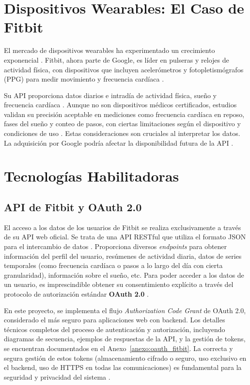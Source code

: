\section{Dispositivos Wearables: El Caso de Fitbit}
\label{sec:ea_fitbit}

El mercado de dispositivos wearables ha experimentado un crecimiento exponencial \cite{fortune_wearable_market}. Fitbit\textsuperscript{\textregistered}, ahora parte de Google, es líder en pulseras y relojes de actividad física, con dispositivos que incluyen acelerómetros y fotopletismógrafos (PPG) para medir movimiento y frecuencia cardíaca \cite{fitbit_how_hr_works}.

Su API proporciona datos diarios e intradía de actividad física, sueño y frecuencia cardíaca \cite{fitbit_api_reference}. Aunque no son dispositivos médicos certificados, estudios validan su precisión aceptable en mediciones como frecuencia cardíaca en reposo, fases del sueño y conteo de pasos, con ciertas limitaciones según el dispositivo y condiciones de uso \cite{haghayegh2019accuracy, nelson2016validity}. Estas consideraciones son cruciales al interpretar los datos. La adquisición por Google podría afectar la disponibilidad futura de la API \cite{google_fitbit_acquisition_info}.
\section{Tecnologías Habilitadoras}
\label{sec:ea_tecnologias}

\subsection{API de Fitbit y OAuth 2.0}
\label{subsec:ea_fitbit_api_oauth}
El acceso a los datos de los usuarios de Fitbit\textsuperscript{\textregistered} se realiza exclusivamente a través de su API web oficial. Se trata de una API RESTful que utiliza el formato JSON para el intercambio de datos \cite{fitbit_api_reference}. Proporciona diversos \textit{endpoints} para obtener información del perfil del usuario, resúmenes de actividad diaria, datos de series temporales (como frecuencia cardíaca o pasos a lo largo del día con cierta granularidad), información sobre el sueño, etc. Para poder acceder a los datos de un usuario, es imprescindible obtener su consentimiento explícito a través del protocolo de autorización estándar \textbf{OAuth 2.0} \cite{oauth_spec_rfc6749}.

En este proyecto, se implementa el flujo \textit{Authorization Code Grant} de OAuth 2.0, considerado el más seguro para aplicaciones web con backend. Los detalles técnicos completos del proceso de autenticación y autorización, incluyendo diagramas de secuencia, ejemplos de respuestas de la API, y la gestión de tokens, se encuentran documentados en el Anexo~\ref{anexo:oauth_fitbit}.
La correcta y segura gestión de estos tokens (almacenamiento cifrado o seguro, uso exclusivo en el backend, uso de HTTPS en todas las comunicaciones) es fundamental para la seguridad y privacidad del sistema \cite{oauth_security_bcp_rfc8252}.

